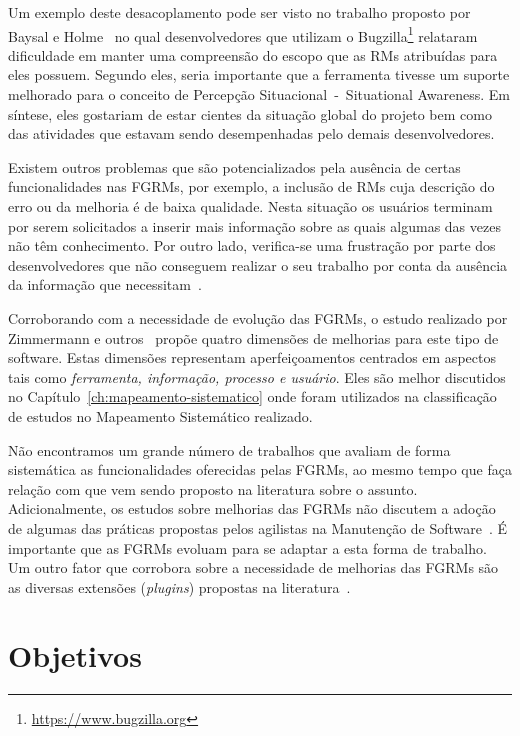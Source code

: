 Um exemplo deste desacoplamento pode ser visto no trabalho proposto por Baysal
e Holme~\cite{baysal2012qualitative} no qual desenvolvedores que utilizam o
Bugzilla\footnote{\url{https://www.bugzilla.org}} relataram dificuldade em
manter uma compreensão do escopo que as RMs atribuídas para eles possuem.
Segundo eles, seria importante que a ferramenta tivesse um suporte melhorado
para o conceito de Percepção Situacional~-~Situational Awareness. Em síntese,
eles gostariam de estar cientes da situação global do projeto bem como das
atividades que estavam sendo desempenhadas pelo demais desenvolvedores.

Existem outros problemas que são potencializados pela ausência de certas
funcionalidades nas FGRMs, por exemplo, a inclusão de RMs cuja descrição do
erro ou da melhoria é de baixa qualidade. Nesta situação os usuários terminam
por serem solicitados a inserir mais informação sobre as quais algumas das
vezes não têm conhecimento. Por outro lado, verifica-se uma frustração por
parte dos desenvolvedores que não conseguem realizar o seu trabalho por conta
da ausência da informação que necessitam~\cite{just2008towards}.

Corroborando com a necessidade de evolução das FGRMs, o estudo realizado por
Zimmermann e outros~\cite{zimmermann2009improving} propõe quatro dimensões de
melhorias para este tipo de software. Estas dimensões representam
aperfeiçoamentos centrados em aspectos tais como \textit{ferramenta, informação,
    processo e usuário}. Eles são melhor discutidos no
Capítulo~\ref{ch:mapeamento-sistematico} onde foram utilizados na classificação
de estudos no Mapeamento Sistemático realizado.

Não encontramos um grande número de trabalhos que avaliam de forma sistemática
as funcionalidades oferecidas pelas FGRMs, ao mesmo tempo que faça relação com
que vem sendo proposto na li\-te\-ra\-tu\-ra sobre o assunto.  Adicionalmente,
os estudos sobre melhorias das FGRMs não discutem a adoção de algumas das
práticas propostas pelos agilistas na Manutenção de Software~\cite{Soltan2016,
    Heeager2015}. É importante que as FGRMs evoluam para se adaptar a esta
forma de trabalho. Um outro fator que corrobora sobre a necessidade de
melhorias das FGRMs são as diversas extensões (\textit{plugins}) propostas na
literatura~\cite{101186,Thung:2014:BIT:2635868.2661678,Kononenko:2014:DED:2591062.2591075}.

\section{Objetivos}\label{sec:intro-objetivos}

